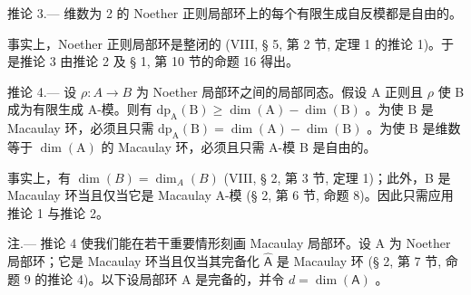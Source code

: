 推论 3.--- 维数为 2 的 Noether 正则局部环上的每个有限生成自反模都是自由的。

事实上，Noether 正则局部环是整闭的 (VIII, § 5, 第 2 节, 定理 1 的推论 1)。于是推论 3 由推论 2 及 § 1, 第 10 节的命题 16 得出。

推论 4.--- 设 \(\rho: A \to B\) 为 Noether 局部环之间的局部同态。假设 A 正则且 \(\rho\) 使 B 成为有限生成 A-模。则有 \(\mathrm{dp}_{\mathrm{A}}(\mathrm{B}) \geqslant \dim(\mathrm{A}) - \dim(\mathrm{B})\) 。为使 B 是 Macaulay 环，必须且只需 \(\mathrm{dp}_{\mathrm{A}}(\mathrm{B}) = \dim(\mathrm{A}) - \dim(\mathrm{B})\) 。为使 B 是维数等于 \(\dim(\mathrm{A})\) 的 Macaulay 环，必须且只需 A-模 B 是自由的。

事实上，有 \(\dim(B) = \dim_A(B)\) (VIII, § 2, 第 3 节, 定理 1)；此外，B 是 Macaulay 环当且仅当它是 Macaulay A-模 (§ 2, 第 6 节, 命题 8)。因此只需应用推论 1 与推论 2。

注.--- 推论 4 使我们能在若干重要情形刻画 Macaulay 局部环。设 A 为 Noether 局部环；它是 Macaulay 环当且仅当其完备化 \(\widehat{\mathsf{A}}\) 是 Macaulay 环 (§ 2, 第 7 节, 命题 9 的推论 4)。以下设局部环 A 是完备的，并令 \(d = \dim(\mathsf{A})\) 。

